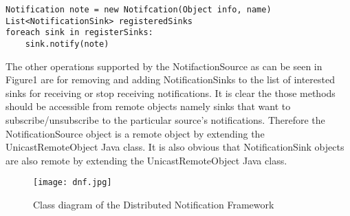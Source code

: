 \documentclass[a4paper,12pt,titlepage]{article}
\begin{document}
\begin{lstlisting}
Notification note = new Notifcation(Object info, name)
List<NotificationSink> registeredSinks
foreach sink in registerSinks:
	sink.notify(note)
\end{lstlisting}
The other operations supported by the NotifactionSource as can be seen in Figure1 are for removing and adding NotificationSinks to the list of interested sinks for receiving or stop receiving notifications. It is clear the those methods should be accessible from remote objects namely sinks that want to subscribe/unsubscribe to the particular source's notifications. Therefore the NotificationSource object is a remote object by extending the UnicastRemoteObject Java class. It is also obvious that NotificationSink objects are also remote by extending the UnicastRemoteObject Java class. 
\begin{figure}[h!]
  \centering
 \texttt{[image: dnf.jpg]}
\caption{Class diagram of the Distributed Notification Framework}
\end{figure}
\end{document}
